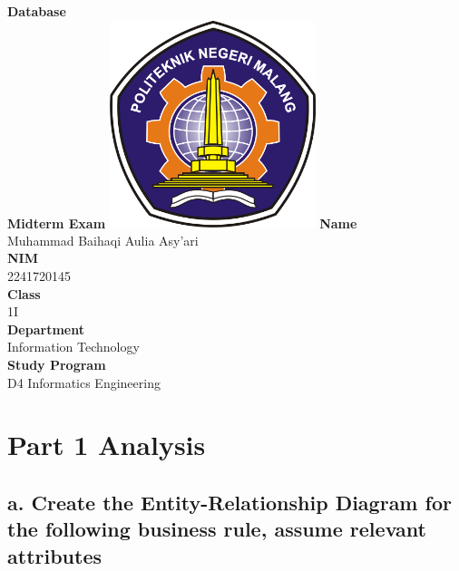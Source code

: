 \documentclass[12pt,titlepage]{article}
\newcommand{\vSubject}{Database}
\newcommand{\vSubtitle}{Midterm Exam}
\newcommand{\vName}{Muhammad Baihaqi Aulia Asy'ari}
\newcommand{\vNIM}{2241720145}
\newcommand{\vClass}{1I}
\newcommand{\vDepartment}{Information Technology}
\newcommand{\vStudyProgram}{D4 Informatics Engineering}
\begin{document}
\begin{titlepage}
    \centering
    \vfill
    {\bfseries\LARGE
        \vSubject\\
        \vskip0.25cm
        \vSubtitle
    }
    \vfill
    \includegraphics[width=6cm]{images/polinema-logo.png}
    \vfill
    {
        \textbf{Name}\\
        \vName\\
        \vskip0.5cm
        \textbf{NIM}\\
        \vNIM\\
        \vskip0.5cm
        \textbf{Class}\\
        \vClass\\
        \vskip0.5cm
        \textbf{Department}\\
        \vDepartment\\
        \vskip0.5cm
        \textbf{Study Program}\\
        \vStudyProgram
    }
\end{titlepage}

\newpage

\section*{Part 1 Analysis}

\subsection*{a. Create the Entity-Relationship Diagram for the following business rule, assume relevant attributes}
\end{document}
